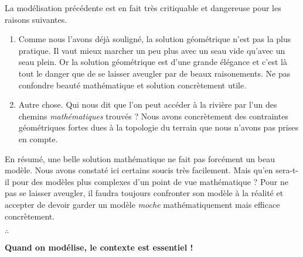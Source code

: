La modélisation précédente est en fait très critiquable et dangereuse pour les raisons suivantes.

\begin{enumerate}
	\item Comme nous l'avons déjà souligné, la solution géométrique n'est pas la plus pratique. Il vaut mieux marcher un peu plus avec un seau vide qu'avec un seau plein. Or la solution géométrique est d'une grande élégance et c'est là tout le danger que de se laisser aveugler par de beaux raisonements. Ne pas confondre beauté mathématique et solution concrètement utile.


	\item Autre chose. Qui nous dit que l'on peut accéder à la rivière par l'un des chemins \emph{\og mathématiques \fg} trouvés ? Nous avons concrètement des contraintes géométriques fortes dues à la topologie du terrain que nous n'avons pas prises en compte.
\end{enumerate}


En résumé, une belle solution mathématique ne fait pas forcément un beau modèle. Nous avons constaté ici certains soucis très facilement. Mais qu'en sera-t-il pour des modèles plus complexes d'un point de vue mathématique ? Pour ne pas se laisser aveugler, il faudra toujours confronter son modèle à la réalité et accepter de devoir garder un modèle \emph{\og moche \fg} mathématiquement mais efficace concrètement.


\bigskip


\begin{center}
	{\Huge $\therefore$}

	\medskip
	
	\textbf{Quand on modélise, le contexte est essentiel !}
\end{center}
